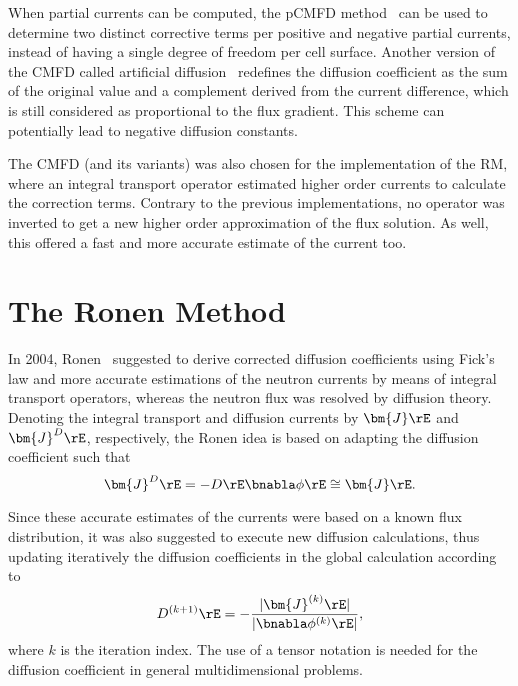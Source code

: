 When partial currents can be computed, the pCMFD method~\cite{Cho-2003} can be used to determine two distinct corrective terms per positive and negative partial currents, instead of having a single degree of freedom per cell surface. Another version of the CMFD called artificial diffusion~\cite{Zhu-2016,Jarrett-2016} redefines the diffusion coefficient as the sum of the original value and a complement derived from the current difference, which is still considered as proportional to the flux gradient. This scheme can potentially lead to negative diffusion constants.

The CMFD (and its variants) was also chosen for the implementation of the RM, where an integral transport operator estimated higher order currents to calculate the correction terms. Contrary to the previous implementations, no operator was inverted to get a new higher order approximation of the flux solution. As well, this offered a fast and more accurate estimate of the current too.


\section{The Ronen Method}
\label{sec:RM}

In 2004, Ronen~\cite{Ronen-2004} suggested to derive corrected diffusion coefficients using Fick's law and more accurate estimations of the neutron currents by means of integral transport operators, whereas the neutron flux was resolved by diffusion theory. Denoting the integral transport and diffusion currents by $\bm{J}\rE$ and $\bm{J}^D\rE$, respectively, the Ronen idea is based on adapting the diffusion coefficient such that
\begin{equation}
  \label{eq:Fick}
  \bm{J}^D\rE = -D\rE\bnabla\phi\rE \cong \bm{J}\rE.
\end{equation}

Since these accurate estimates of the currents were based on a known flux distribution, it was also suggested to execute new diffusion calculations, thus updating iteratively the diffusion coefficients in the global calculation according to
\begin{equation}
  \label{eq:RM-it}
  D^{(k+1)}\rE = - \frac{\lvert \bm{J}^{(k)}\rE \rvert}{\lvert \bnabla \phi^{(k)}\rE \rvert},
\end{equation}
where $k$ is the iteration index. The use of a tensor notation is needed for the diffusion coefficient in general multidimensional problems.

